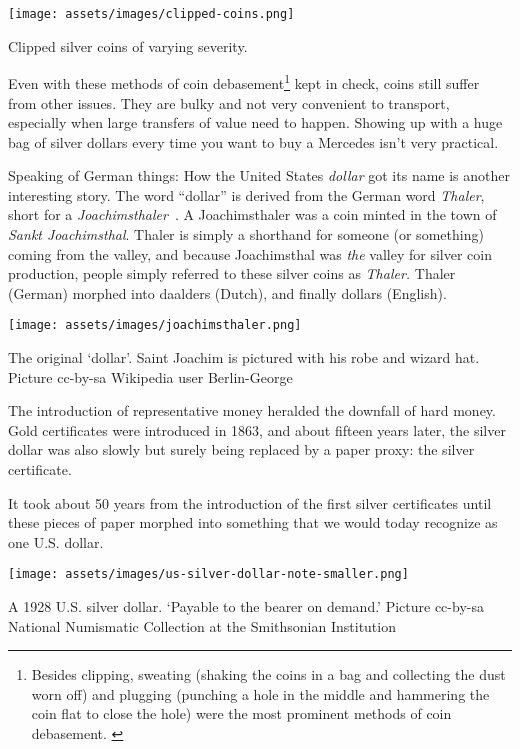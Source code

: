 \begin{center}
  \texttt{[image: assets/images/clipped-coins.png]}
  \caption{Clipped silver coins of varying severity.}
  \label{fig:clipped-coins}
\end{center}

Even with these methods of coin debasement\footnote{Besides clipping, sweating
(shaking the coins in a bag and collecting the dust worn off) and plugging
(punching a hole in the middle and hammering the coin flat to close the hole)
were the most prominent methods of coin debasement. \cite{wiki:coin-debasement}}
kept in check, coins still suffer from other issues. They are bulky and not very
convenient to transport, especially when large transfers of value need to
happen. Showing up with a huge bag of silver dollars every time you want to buy
a Mercedes isn't very practical.

Speaking of German things: How the United States \textit{dollar} got its name is
another interesting story. The word \enquote{dollar} is derived from the German word
\textit{Thaler}, short for a \textit{Joachimsthaler}~\cite{wiki:thaler}. A
Joachimsthaler was a coin minted in the town of \textit{Sankt Joachimsthal}.
Thaler is simply a shorthand for someone (or something) coming from the valley,
and because Joachimsthal was \textit{the} valley for silver coin production,
people simply referred to these silver coins as \textit{Thaler.} Thaler (German)
morphed into daalders (Dutch), and finally dollars (English).

\begin{center}
  \centering
  \texttt{[image: assets/images/joachimsthaler.png]}
  \caption{The original `dollar'. Saint Joachim is pictured with his robe and wizard hat. Picture cc-by-sa Wikipedia user Berlin-George}
  \label{fig:joachimsthaler}
\end{center}

The introduction of representative money heralded the downfall of hard
money. Gold certificates were introduced in 1863, and about fifteen
years later, the silver dollar was also slowly but surely being replaced
by a paper proxy: the silver certificate. \cite{wiki:silver-certificate}

It took about 50 years from the introduction of the first silver
certificates until these pieces of paper morphed into something that we
would today recognize as one U.S. dollar.

\begin{center}
  \centering
  \texttt{[image: assets/images/us-silver-dollar-note-smaller.png]}
  \caption{A 1928 U.S. silver dollar. `Payable to the bearer on demand.' Picture cc-by-sa National Numismatic Collection at the Smithsonian Institution}
  \label{fig:us-silver-dollar-note-smaller}
\end{center}

